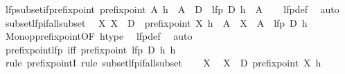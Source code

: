 \begin{isabellebody}
\endisatagproof
{\isafoldproof}%
%
\isadelimproof
\isanewline
%
\endisadelimproof
\isanewline
{}\isamarkupfalse%
\ lfp{\isacharunderscore}{\kern0pt}subset{\isacharunderscore}{\kern0pt}if{\isacharunderscore}{\kern0pt}prefixpoint{\isacharcolon}{\kern0pt}\ {\isachardoublequoteopen}prefixpoint\ A\ h\ {\isasymLongrightarrow}\ A\ {\isasymsubseteq}\ D\ {\isasymLongrightarrow}\ lfp\ D\ h\ {\isasymsubseteq}\ A{\isachardoublequoteclose}\isanewline
%
\isadelimproof
\ \ %
\endisadelimproof
%
\isatagproof
{}\isamarkupfalse%
\ lfp{\isacharunderscore}{\kern0pt}def\ \isamarkupfalse%
\ auto%
\endisatagproof
{\isafoldproof}%
%
\isadelimproof
\isanewline
%
\endisadelimproof
\isanewline
{}\isamarkupfalse%
\ subset{\isacharunderscore}{\kern0pt}lfp{\isacharunderscore}{\kern0pt}if{\isacharunderscore}{\kern0pt}all{\isacharunderscore}{\kern0pt}subset{\isacharcolon}{\kern0pt}\isanewline
\ \ {\isachardoublequoteopen}{\isacharparenleft}{\kern0pt}{\isasymAnd}X{\isachardot}{\kern0pt}\ X\ {\isasymsubseteq}\ D\ {\isasymLongrightarrow}\ prefixpoint\ X\ h\ {\isasymLongrightarrow}\ A\ {\isasymsubseteq}\ X{\isacharparenright}{\kern0pt}\ {\isasymLongrightarrow}\ A\ {\isasymsubseteq}\ lfp\ D\ h{\isachardoublequoteclose}\isanewline
%
\isadelimproof
\ \ %
\endisadelimproof
%
\isatagproof
{}\isamarkupfalse%
\ Monop{\isacharunderscore}{\kern0pt}prefixpoint{\isacharbrackleft}{\kern0pt}OF\ h{\isacharunderscore}{\kern0pt}type{\isacharbrackright}{\kern0pt}\ \isamarkupfalse%
\ lfp{\isacharunderscore}{\kern0pt}def\ \isamarkupfalse%
\ auto%
\endisatagproof
{\isafoldproof}%
%
\isadelimproof
\isanewline
%
\endisadelimproof
\isanewline
{}\isamarkupfalse%
\ prefixpoint{\isacharunderscore}{\kern0pt}lfp\ {\isacharbrackleft}{\kern0pt}iff{\isacharbrackright}{\kern0pt}{\isacharcolon}{\kern0pt}\ {\isachardoublequoteopen}prefixpoint\ {\isacharparenleft}{\kern0pt}lfp\ D\ h{\isacharparenright}{\kern0pt}\ h{\isachardoublequoteclose}\isanewline
%
\isadelimproof
%
\endisadelimproof
%
\isatagproof
{}\isamarkupfalse%
\ {\isacharparenleft}{\kern0pt}rule\ prefixpointI{\isacharcomma}{\kern0pt}\ rule\ subset{\isacharunderscore}{\kern0pt}lfp{\isacharunderscore}{\kern0pt}if{\isacharunderscore}{\kern0pt}all{\isacharunderscore}{\kern0pt}subset{\isacharparenright}{\kern0pt}\isanewline
\ \ \isamarkupfalse%
\ X\ \isamarkupfalse%
\ {\isachardoublequoteopen}X\ {\isasymsubseteq}\ D{\isachardoublequoteclose}\ {\isachardoublequoteopen}prefixpoint\ X\ h{\isachardoublequoteclose}\isanewline

\end{isabellebody}
